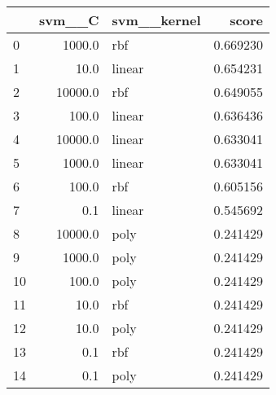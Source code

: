 \begin{tabular}{lrlr}
\toprule
{} &   svm\_\_C & svm\_\_kernel &     score \\
\midrule
0  &   1000.0 &         rbf &  0.669230 \\
1  &     10.0 &      linear &  0.654231 \\
2  &  10000.0 &         rbf &  0.649055 \\
3  &    100.0 &      linear &  0.636436 \\
4  &  10000.0 &      linear &  0.633041 \\
5  &   1000.0 &      linear &  0.633041 \\
6  &    100.0 &         rbf &  0.605156 \\
7  &      0.1 &      linear &  0.545692 \\
8  &  10000.0 &        poly &  0.241429 \\
9  &   1000.0 &        poly &  0.241429 \\
10 &    100.0 &        poly &  0.241429 \\
11 &     10.0 &         rbf &  0.241429 \\
12 &     10.0 &        poly &  0.241429 \\
13 &      0.1 &         rbf &  0.241429 \\
14 &      0.1 &        poly &  0.241429 \\
\bottomrule
\end{tabular}
